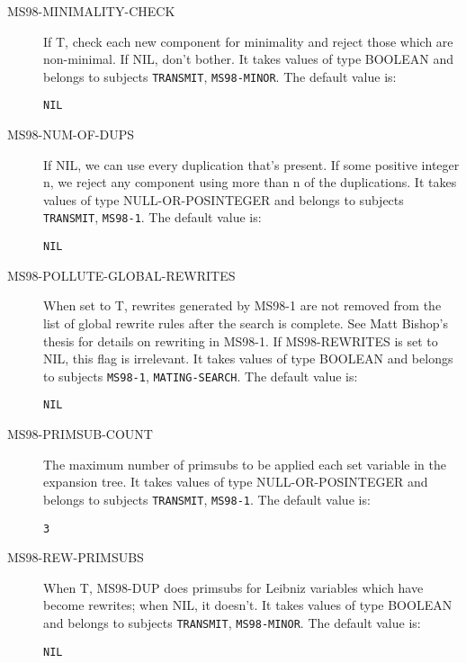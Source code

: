 \begin{description}
\item[MS98-MINIMALITY-CHECK]  
If T, check each new component for minimality and reject 
those which are non-minimal. If NIL, don't bother.
It takes values of type BOOLEAN and belongs to subjects \texttt{TRANSMIT}, \texttt{MS98-MINOR}.  The default value is: \begin{lstlisting}
NIL
\end{lstlisting}

\item[MS98-NUM-OF-DUPS]  
If NIL, we can use every duplication that's present.
If some positive integer n, we reject any component using more than n 
of the duplications.
It takes values of type NULL-OR-POSINTEGER and belongs to subjects \texttt{TRANSMIT}, \texttt{MS98-1}.  The default value is: \begin{lstlisting}
NIL
\end{lstlisting}

\item[MS98-POLLUTE-GLOBAL-REWRITES]  
When set to T, rewrites generated by MS98-1 are not removed from
the list of global rewrite rules after the search is complete.
See Matt Bishop's thesis for details on rewriting in MS98-1.
If MS98-REWRITES is set to NIL, this flag is irrelevant.
It takes values of type BOOLEAN and belongs to subjects \texttt{MS98-1}, \texttt{MATING-SEARCH}.  The default value is: \begin{lstlisting}
NIL
\end{lstlisting}

\item[MS98-PRIMSUB-COUNT]  
The maximum number of primsubs to be applied each
set variable in the expansion tree.
It takes values of type NULL-OR-POSINTEGER and belongs to subjects \texttt{TRANSMIT}, \texttt{MS98-1}.  The default value is: \begin{lstlisting}
3
\end{lstlisting}

\item[MS98-REW-PRIMSUBS]  
When T, MS98-DUP does primsubs for Leibniz variables which 
have become rewrites; when NIL, it doesn't.
It takes values of type BOOLEAN and belongs to subjects \texttt{TRANSMIT}, \texttt{MS98-MINOR}.  The default value is: \begin{lstlisting}
NIL
\end{lstlisting}


\end{description}
